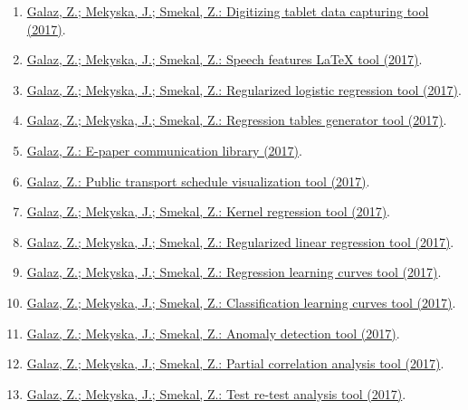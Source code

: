 \begin{enumerate}
\footnotesize
	\item \href{http://splab.cz/en/download/software/software-pro-zaznam-dat-z-tabletu}{Galaz, Z.; Mekyska, J.; Smekal, Z.: Digitizing tablet data capturing tool (2017)}.
	\item \href{http://splab.cz/en/download/software/software-pro-konverzi-recovych-parametru-do-notace-latex}{Galaz, Z.; Mekyska, J.; Smekal, Z.: Speech features LaTeX tool (2017)}.
	\item \href{http://splab.cz/en/download/software/software-pro-regularizovanou-logistickou-regresi}{Galaz, Z.; Mekyska, J.; Smekal, Z.: Regularized logistic regression tool (2017)}.
	\item \href{http://splab.cz/en/download/software/software-pro-generovani-tabulek-regresni-analyzy}{Galaz, Z.; Mekyska, J.; Smekal, Z.: Regression tables generator tool (2017)}.
	\item \href{http://splab.cz/en/download/software/knihovna-pro-komunikaci-s-e-paper-zarizenim}{Galaz, Z.: E-paper communication library (2017)}.
	\item \href{http://splab.cz/en/download/software/software-pro-zobrazovani-jizdnich-radu}{Galaz, Z.: Public transport schedule visualization tool (2017)}.
	\item \href{http://splab.cz/en/download/software/software-pro-neparametrickou-regresni-analyzu}{Galaz, Z.; Mekyska, J.; Smekal, Z.: Kernel regression tool (2017)}.
	\item \href{http://splab.cz/en/download/software/software-pro-regularizovanou-regresni-analyzu}{Galaz, Z.; Mekyska, J.; Smekal, Z.: Regularized linear regression tool (2017)}.
	\item \href{http://splab.cz/en/download/software/software-pro-regresni-ucici-krivky}{Galaz, Z.; Mekyska, J.; Smekal, Z.: Regression learning curves tool (2017)}.
	\item \href{http://splab.cz/en/download/software/software-pro-klasifikacni-ucici-krivky}{Galaz, Z.; Mekyska, J.; Smekal, Z.: Classification learning curves tool (2017)}.
	\item \href{http://splab.cz/en/download/software/software-pro-detekci-anomalii}{Galaz, Z.; Mekyska, J.; Smekal, Z.: Anomaly detection tool (2017)}.
	\item \href{http://splab.cz/en/download/software/software-pro-parcialni-korelacni-analyzu}{Galaz, Z.; Mekyska, J.; Smekal, Z.: Partial correlation analysis tool (2017)}.
	\item \href{http://splab.cz/en/download/software/software-pro-overeni-validity-opakovane-analyzy}{Galaz, Z.; Mekyska, J.; Smekal, Z.: Test re-test analysis tool (2017)}.

\end{enumerate}
